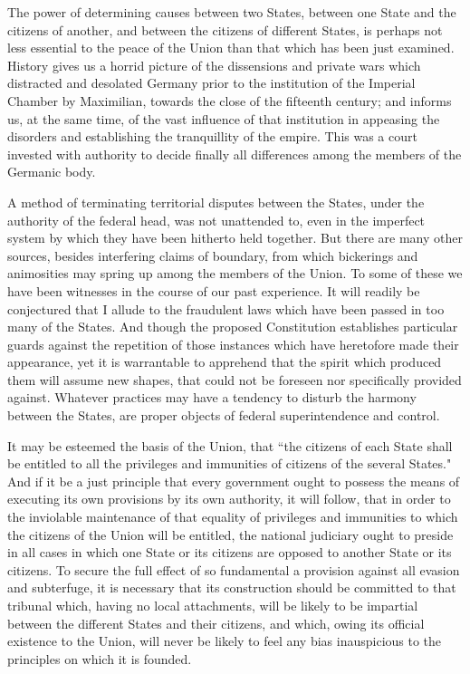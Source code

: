 The power of determining causes between two States, between one State and the citizens of another, and between the citizens of different States, is perhaps not less essential to the peace of the Union than that which has been just examined. History gives us a horrid picture of the dissensions and private wars which distracted and desolated Germany prior to the institution of the Imperial Chamber by Maximilian, towards the close of the fifteenth century; and informs us, at the same time, of the vast influence of that institution in appeasing the disorders and establishing the tranquillity of the empire. This was a court invested with authority to decide finally all differences among the members of the Germanic body.

A method of terminating territorial disputes between the States, under the authority of the federal head, was not unattended to, even in the imperfect system by which they have been hitherto held together. But there are many other sources, besides interfering claims of boundary, from which bickerings and animosities may spring up among the members of the Union. To some of these we have been witnesses in the course of our past experience. It will readily be conjectured that I allude to the fraudulent laws which have been passed in too many of the States. And though the proposed Constitution establishes particular guards against the repetition of those instances which have heretofore made their appearance, yet it is warrantable to apprehend that the spirit which produced them will assume new shapes, that could not be foreseen nor specifically provided against. Whatever practices may have a tendency to disturb the harmony between the States, are proper objects of federal superintendence and control.

It may be esteemed the basis of the Union, that ``the citizens of each State shall be entitled to all the privileges and immunities of citizens of the several States." And if it be a just principle that every government ought to possess the means of executing its own provisions by its own authority, it will follow, that in order to the inviolable maintenance of that equality of privileges and immunities to which the citizens of the Union will be entitled, the national judiciary ought to preside in all cases in which one State or its citizens are opposed to another State or its citizens. To secure the full effect of so fundamental a provision against all evasion and subterfuge, it is necessary that its construction should be committed to that tribunal which, having no local attachments, will be likely to be impartial between the different States and their citizens, and which, owing its official existence to the Union, will never be likely to feel any bias inauspicious to the principles on which it is founded.


